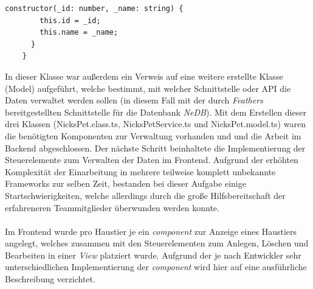\documentclass[10pt, a4paper]{article}
\begin{document}
\begin{onehalfspace}
\begin{minipage}{\textwidth}
\begin{lstlisting}[caption={NicksPetService (Hello World)}, captionpos=b]
      constructor(_id: number, _name: string) {
        this.id = _id;
        this.name = _name;
      }
    }
  \end{lstlisting}
\end{minipage}
In dieser Klasse war außerdem ein Verweis auf eine weitere erstellte Klasse (Model) aufgeführt, welche bestimmt, mit welcher Schnittstelle oder API die Daten
verwaltet werden sollen (in diesem Fall mit der durch \textit{Feathers} bereitgestellten Schnittstelle für die Datenbank \textit{NeDB}).
Mit dem Erstellen dieser drei Klassen (NicksPet.class.ts, NicksPetService.ts und NicksPet.model.ts) waren die benötigten Komponenten zur Verwaltung vorhanden und
und die Arbeit im Backend abgeschlossen. Der nächste Schritt beinhaltete die Implementierung der Steuerelemente zum Verwalten der Daten im Frontend.
Aufgrund der erhöhten Komplexität der Einarbeitung in mehrere teilweise komplett unbekannte Frameworks zur selben Zeit, bestanden bei dieser Aufgabe
einige Startschwierigkeiten, welche allerdings durch die große Hilfsbereitschaft der erfahreneren Teammitglieder überwunden werden konnte.
\\~\\
Im Frontend wurde pro Haustier je ein \textit{component} zur Anzeige eines Haustiers angelegt,
welches zusammen mit den Steuerelementen zum Anlegen, Löschen und Bearbeiten in einer \textit{View} platziert wurde.
Aufgrund der je nach Entwickler sehr unterschiedlichen Implementierung der \textit{component} wird hier auf eine ausführliche Beschreibung verzichtet.


\end{onehalfspace}
\end{document}

